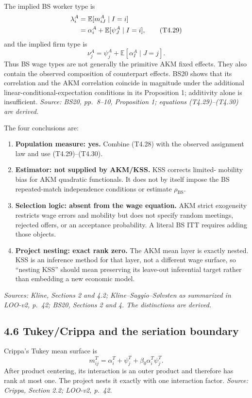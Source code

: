 \documentclass[11pt]{article}
\begin{document}
The implied BS worker type is
\begin{align}
\lambda_i^A
&=
\mathbb E[m^A_{iJ}\mid I=i] \notag\\
&=
\alpha_i^A+\mathbb E[\psi_J^A\mid I=i],
\tag{T4.29}
\end{align}
and the implied firm type is
\[
\nu_j^A
=
\psi_j^A+\mathbb E[\alpha_I^A\mid J=j].
\tag{T4.30}
\]
Thus BS wage types are not generally the primitive AKM fixed effects.  They
also contain the observed composition of counterpart effects.  BS20 shows
that its correlation and the AKM correlation coincide in magnitude under the
additional linear-conditional-expectation conditions in its Proposition 1;
additivity alone is insufficient.
\textit{Source: BS20, pp.\ 8--10, Proposition 1; equations
(T4.29)--(T4.30) are derived.}

The four conclusions are:

\begin{enumerate}
\item \textbf{Population measure: yes.}  Combine (T4.28) with the observed
  assignment law and use (T4.29)--(T4.30).
\item \textbf{Estimator: not supplied by AKM/KSS.}  KSS corrects limited-
  mobility bias for AKM quadratic functionals.  It does not by itself impose
  the BS repeated-match independence conditions or estimate
  \(\rho_{\mathrm{BS}}\).
\item \textbf{Selection logic: absent from the wage equation.}  AKM strict
  exogeneity restricts wage errors and mobility but does not specify random
  meetings, rejected offers, or an acceptance probability.  A literal BS
  ITT requires adding those objects.
\item \textbf{Project nesting: exact rank zero.}  The AKM mean layer is
  exactly nested.  KSS is an inference method for that layer, not a different
  wage surface, so ``nesting KSS'' should mean preserving its leave-out
  inferential target rather than embedding a new economic model.
\end{enumerate}

\textit{Sources: Kline, Sections 2 and 4.2; Kline--Saggio--S{\o}lvsten as
summarized in LOO-v2, p.\ 42; BS20, Sections 2 and 4.  The distinctions are
derived.}

\subsection{4.6 Tukey/Crippa and the seriation boundary}

Crippa's Tukey mean surface is
\[
m^T_{ij}
=
\alpha_i^T+\psi_j^T+\beta_0\alpha_i^T\psi_j^T.
\tag{T4.31}
\]
After product centering, its interaction is an outer product and therefore
has rank at most one.  The project nests it exactly with one interaction
factor.
\textit{Source: Crippa, Section 2.2; LOO-v2, p.\ 42.}
\end{document}
